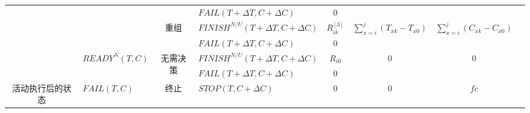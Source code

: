 \begin{table}[htbp]
\begin{threeparttable}
\begin{tabular}{llllllll}
            \multicolumn{1}{|c|}{} 
            &       
            & \multicolumn{1}{|c}{} 
            & \multicolumn{1}{|l}{$FAIL(T+\Delta T,C+\Delta C)$} 
            & \multicolumn{1}{|c}{0} 
            & \multicolumn{1}{|c}{} 
            & \multicolumn{1}{|c|}{} \\
            \cline{3-7}
            
            \multicolumn{1}{|c|}{} 
            &       
            & \multicolumn{1}{|c}{\multirow{2}{*}{重组}} 
            & \multicolumn{1}{|l}{$FINISH^{N/U}(T+\Delta T,C+\Delta C)$} 
            & \multicolumn{1}{|c}{$R_{ik}^{[3]}$} 
            & \multicolumn{1}{|c}{\multirow{2}{*}{$\sum\limits_{x = i}^j {({T_{xk}} - {T_{x0}})} $}}
            & \multicolumn{1}{|c|}{\multirow{2}{*}{$\sum\limits_{x = i}^j {({C_{xk}} - {C_{x0}})} $}} \\
            
            \multicolumn{1}{|c|}{} 
            &       
            & \multicolumn{1}{|c}{} 
            & \multicolumn{1}{|l}{$FAIL(T+\Delta T,C+\Delta C)$} 
            & \multicolumn{1}{|c}{0} 
            & \multicolumn{1}{|c}{}
            & \multicolumn{1}{|c|}{} \\
            \cline{2-7}
            
            \multicolumn{1}{|c|}{} 
            & \multirow{2}{*}{$READY^N(T,C)$} 
            & \multicolumn{1}{|c}{\multirow{2}{*}{无需决策}} 
            & \multicolumn{1}{|l}{$FINISH^{N/U}(T+\Delta T,C+\Delta C)$} 
            & \multicolumn{1}{|c}{$R_{i0}$} 
            & \multicolumn{1}{|c}{\multirow{2}{*}{0}} 
            & \multicolumn{1}{|c|}{\multirow{2}{*}{0}} \\
            
            \multicolumn{1}{|c|}{} 
            &       
            & \multicolumn{1}{|c}{} 
            & \multicolumn{1}{|l}{$FAIL(T+\Delta T,C+\Delta C)$} 
            & \multicolumn{1}{|c}{0} 
            & \multicolumn{1}{|c}{} 
            & \multicolumn{1}{|c|}{} \\
            \cline{1-7}
            
            \multicolumn{1}{|c|}{\multirow{11}{*}{\parbox{1em}{活动执行后的状态}}} 
            & \multirow{7}{*}{$FAIL(T,C)$} 
            & \multicolumn{1}{|c}{终止} 
            & \multicolumn{1}{|l}{$STOP(T,C+\Delta C)$} 
            & \multicolumn{1}{|c}{0} 
            & \multicolumn{1}{|c}{0} 
            & \multicolumn{1}{|c|}{$fc$} \\
            \cline{3-7}
            

\end{tabular}
\end{threeparttable}
\end{table}
